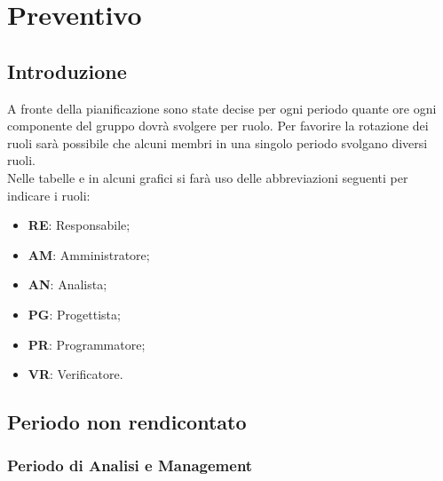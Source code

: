 \section{Preventivo} 
	\subsection{Introduzione}
		A fronte della pianificazione sono state decise per ogni periodo quante ore ogni componente del gruppo dovrà svolgere per ruolo.
		Per favorire la rotazione dei ruoli sarà possibile che alcuni membri in una singolo periodo svolgano diversi ruoli. \\
		Nelle tabelle e in alcuni grafici si farà uso delle abbreviazioni seguenti per indicare i ruoli:
		\begin{itemize} 
			\item \textbf{RE}: Responsabile;
			\item \textbf{AM}: Amministratore;
			\item \textbf{AN}: Analista;
			\item \textbf{PG}: Progettista;
			\item \textbf{PR}: Programmatore;
			\item \textbf{VR}: Verificatore.
		\end{itemize}
		
	\newpage	
	\subsection{Periodo non rendicontato}
		
		\subsubsection{Periodo di Analisi e Management}
		
